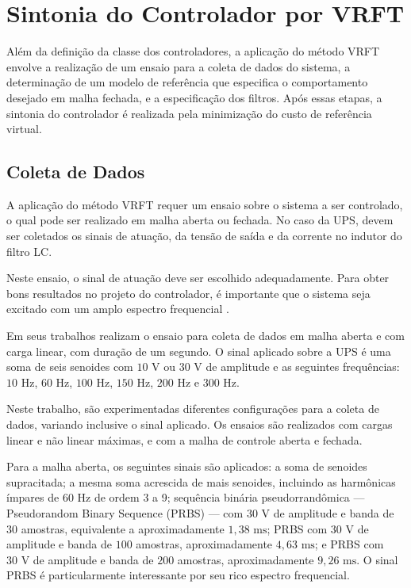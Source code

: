 \documentclass[repeatfields,oneside,overleaf]{tcc}
\begin{document}
\section{Sintonia do Controlador por VRFT}

Além da definição da classe dos controladores, a aplicação do método VRFT envolve a realização de um ensaio para a coleta de dados do sistema, a determinação de um modelo de referência que especifica o comportamento desejado em malha fechada, e a especificação dos filtros.
Após essas etapas, a sintonia do controlador é realizada pela minimização do custo de referência virtual.

\subsection{Coleta de Dados}

A aplicação do método VRFT requer um ensaio sobre o sistema a ser controlado, o qual pode ser realizado em malha aberta ou fechada.
No caso da UPS, devem ser coletados os sinais de atuação, da tensão de saída e da corrente no indutor do filtro LC.

Neste ensaio, o sinal de atuação deve ser escolhido adequadamente.
Para obter bons resultados no projeto do controlador, é importante que o sistema seja excitado com um amplo espectro frequencial \cite{Bazanella2011}.

Em seus trabalhos \textcite{Corleta2015, Corleta2016, Bruna2020} realizam o ensaio para coleta de dados em malha aberta e com carga linear, com duração de um segundo.
O sinal aplicado sobre a UPS é uma soma de seis senoides com $10 \text{ V}$ ou $30 \text{ V}$ de amplitude e as seguintes frequências: $10 \text{ Hz}$, $60 \text{ Hz}$, $100 \text{ Hz}$, $150 \text{ Hz}$, $200 \text{ Hz}$ e $300 \text{ Hz}$.

Neste trabalho, são experimentadas diferentes configurações para a coleta de dados, variando inclusive o sinal aplicado.
Os ensaios são realizados com cargas linear e não linear máximas, e com a malha de controle aberta e fechada.

Para a malha aberta, os seguintes sinais são aplicados:
a soma de senoides supracitada;
a mesma soma acrescida de mais senoides, incluindo as harmônicas ímpares de $60 \text{ Hz}$ de ordem 3 a 9;
sequência binária pseudorrandômica --- Pseudorandom Binary Sequence (PRBS) --- com $30 \text{ V}$ de amplitude e banda de $30$ amostras, equivalente a aproximadamente $1,38 \text{ ms}$;
PRBS com $30 \text{ V}$ de amplitude e banda de $100$ amostras, aproximadamente $4,63 \text{ ms}$; e
PRBS com $30 \text{ V}$ de amplitude e banda de $200$ amostras, aproximadamente $9,26 \text{ ms}$.
O sinal PRBS é particularmente interessante por seu rico espectro frequencial.
\end{document}
